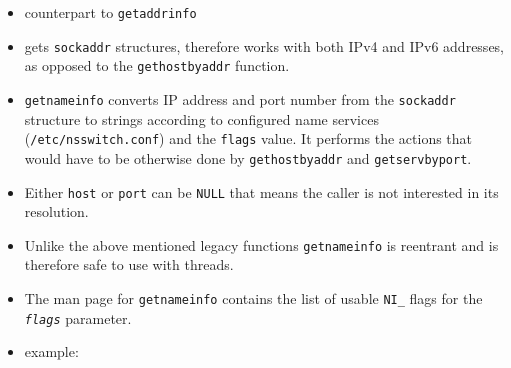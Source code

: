 \begin{slide}

\begin{itemize}
\item counterpart to \texttt{getaddrinfo}
\item gets \texttt{sockaddr} structures, therefore works with both
IPv4 and IPv6 addresses, as opposed to the \texttt{gethostbyaddr} function.
\end{itemize}

\end{slide}

\begin{itemize}
\item \texttt{getnameinfo} converts IP address and port number from the
\texttt{sockaddr} structure to strings according to configured name services
(\texttt{/etc/nsswitch.conf}) and the \texttt{flags} value.
It performs the actions that would have to be otherwise done by
\texttt{gethostbyaddr} and \texttt{getservbyport}.
\item Either \texttt{host} or \texttt{port} can be \texttt{NULL} that
means the caller is not interested in its resolution.
\item Unlike the above mentioned legacy functions \texttt{getnameinfo} is
reentrant and is therefore safe to use with threads.
\item The man page for \texttt{getnameinfo} contains the list of usable
\texttt{NI\_} flags for the \texttt{\emph{flags}} parameter.
\item \label{GETNAMEINFO} example: 


\end{itemize}


\label{TCPSRVEXAMPLE}

